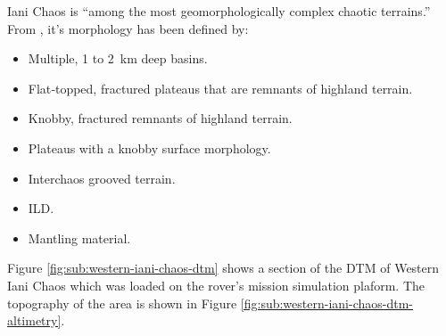 Iani Chaos is ``among the most geomorphologically complex chaotic terrains.'' From  , it's morphology has been defined by:

\begin{itemize}
    \item Multiple, 1 to \SI{2}{\kilo\meter} deep basins.
    \item Flat‐topped, fractured plateaus that are remnants of highland terrain.
    \item Knobby, fractured remnants of highland terrain.
    \item Plateaus with a knobby surface morphology.
    \item Interchaos grooved terrain.
    \item \ac{ILD}.
    \item Mantling material.
\end{itemize}

Figure \ref{fig:sub:western-iani-chaos-dtm} shows a section of the \ac{DTM} of Western Iani Chaos which was loaded on the rover's mission simulation plaform. The topography of the area is shown in Figure \ref{fig:sub:western-iani-chaos-dtm-altimetry}.

\vspace{0.5cm}

